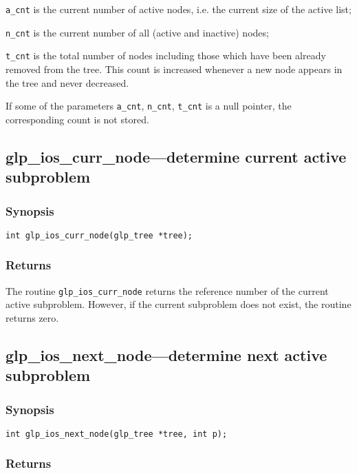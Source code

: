 \verb|a_cnt| is the current number of active nodes, i.e. the current
size of the active list;

\verb|n_cnt| is the current number of all (active and inactive) nodes;

\verb|t_cnt| is the total number of nodes including those which have
been already removed from the tree. This count is increased whenever
a new node appears in the tree and never decreased.

If some of the parameters \verb|a_cnt|, \verb|n_cnt|, \verb|t_cnt| is
a null pointer, the corresponding count is not stored.

\subsection{glp\_ios\_curr\_node---determine current active
subproblem}

\subsubsection*{Synopsis}

\begin{verbatim}
int glp_ios_curr_node(glp_tree *tree);
\end{verbatim}

\subsubsection*{Returns}

The routine \verb|glp_ios_curr_node| returns the reference number of the
current active subproblem. However, if the current subproblem does not
exist, the routine returns zero.

\newpage

\subsection{glp\_ios\_next\_node---determine next active subproblem}

\subsubsection*{Synopsis}

\begin{verbatim}
int glp_ios_next_node(glp_tree *tree, int p);
\end{verbatim}

\subsubsection*{Returns}

